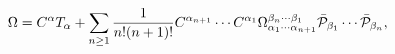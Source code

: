 \begin{equation}
\Omega=C^{\alpha}T_{\alpha}+\sum_{n\ge1}\frac{1}{n!(n+1)!}C^{\alpha_{n+1}}\cdots
C^{\alpha_{1}}\Omega_{\alpha_{1}\cdots\alpha_{n+1}}^{\beta_{n}\cdots\beta_{1}%
}\bar{{\cal P}}_{\beta_{1}}\cdots\bar{{\cal P}}_{\beta_{n}},\label{2.9}%
\end{equation}

